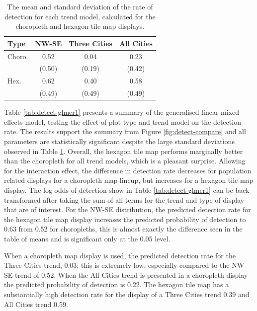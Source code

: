 \documentclass{monashthesis}
\begin{document}
\begin{table}[!h]

\caption{\label{tab:desc-stats}The mean and standard deviation of the rate of detection for each trend model, calculated for the choropleth and hexagon tile map displays.}
\centering
\begin{tabular}[t]{lccc}
\toprule
Type & NW-SE & Three Cities & All Cities\\
\midrule
Choro. & 0.52 & 0.04 & 0.23\\
 & (0.50) & (0.19) & (0.42)\\
\addlinespace
Hex. & 0.62 & 0.40 & 0.58\\
 & (0.49) & (0.49) & (0.49)\\
\bottomrule
\end{tabular}
\end{table}

Table \ref{tab:detect-glmer1} presents a summary of the generalised linear mixed effects model, testing the effect of plot type and trend model on the detection rate. The results support the summary from Figure \ref{fig:detect-compare} and all parameters are statistically significant despite the large standard deviations observed in Table \ref{tab:desc-stats}. Overall, the hexagon tile map performs marginally better than the choropleth for all trend models, which is a pleasant surprise. Allowing for the interaction effect, the difference in detection rate decreases for population related displays for a choropleth map lineup, but increases for a hexagon tile map display.
The log odds of detection show in Table \ref{tab:detect-glmer1} can be back transformed after taking the sum of all terms for the trend and type of display that are of interest.
For the NW-SE distribution, the predicted detection rate for the hexagon tile map display increases the predicted probability of detection to 0.63 from 0.52 for choropleths, this is almost exactly the difference seen in the table of means and is significant only at the 0.05 level.

When a choropleth map display is used, the predicted detection rate for the Three Cities trend, 0.03; this is extremely low, especially compared to the NW-SE trend of 0.52.
When the All Cities trend is presented in a choropleth display the predicted probability of detection is 0.22.
The hexagon tile map has a substantially high detection rate for the display of a Three Cities trend 0.39 and All Cities trend 0.59.
\end{document}
